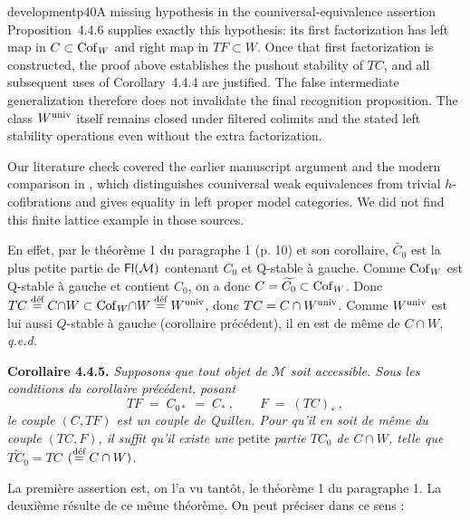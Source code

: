 \begin{dcomment}{development}{p40}{A missing hypothesis in the couniversal-equivalence assertion}
Proposition~4.4.6 supplies exactly this hypothesis: its first factorization has left map in $C\subset\Cof_W$ and right map in $TF\subset W$. Once that first factorization is constructed, the proof above establishes the pushout stability of $TC$, and all subsequent uses of Corollary~4.4.4 are justified. The false intermediate generalization therefore does not invalidate the final recognition proposition. The class $W^{\univ}$ itself remains closed under filtered colimits and the stated left stability operations even without the extra factorization.

Our literature check covered the earlier manuscript argument and the modern comparison in \citet[Lemma~1.10]{BataninBerger2017}, which distinguishes couniversal weak equivalences from trivial $h$-cofibrations and gives equality in left proper model categories. We did not find this finite lattice example in those sources.
\end{dcomment}


En effet, par le théorème 1 du paragraphe 1 (p. 10) et son corollaire, $\widetilde{C_0}$ est la plus petite partie de $\Fl(\mathcal{M})$ contenant $C_0$ et Q-stable à gauche. Comme $\Cof_W$ est Q-stable à gauche et contient $C_0$, on a donc $C=\widetilde{C_0}\subset\Cof_W$. Donc $TC\deq C{\cap}W\subset\Cof_W{\cap}W\deq W^{\univ}$, donc $TC=C\cap W^{\univ}$. Comme $W^{\univ}$ est lui aussi $Q$-stable à gauche (corollaire précédent), il en est de même de $C\cap W$, \quad \textit{q.e.d.}

\textbf{Corollaire 4.4.5.} \textit{Supposons que tout objet de $\mathcal{M}$ soit accessible. Sous les conditions du corollaire précédent, posant}
\[
TF\;=\;C_{0*}\;=\;C_*\ ,\qquad F\;=\;(TC)_*\ ,
\]
\textit{le couple $(C,TF)$ est un couple de Quillen. Pour qu'il en soit de même du couple $(TC,F)$, il suffit qu'il existe une} petite \textit{partie $TC_0$ de $C\cap W$, telle que $\widetilde{TC_0}=TC$ $(\deq C\cap W)$.}

La première assertion est, on l'a vu tantôt, le théorème 1 du paragraphe 1. La deuxième résulte de ce même théorème. On peut préciser dans ce sens :

